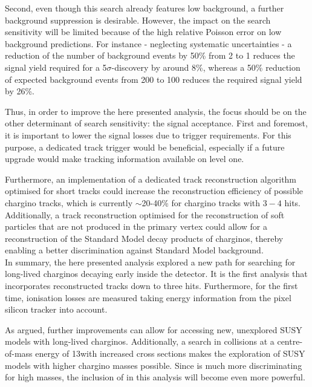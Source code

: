 Second, even though this search already features low background, a further background suppression is desirable.
However, the impact on the search sensitivity will be limited because of the high relative Poisson error on low background predictions.
For instance - neglecting systematic uncertainties - a reduction of the number of background events by 50\% from 2 to 1 reduces the signal yield required for a 5$\sigma$-discovery by around 8\%, whereas a 50\% reduction of expected background events from 200 to 100 reduces the required signal yield by 26\%.

Thus, in order to improve the here presented analysis, the focus should be on the other determinant of search sensitivity: the signal acceptance.
First and foremost, it is important to lower the signal losses due to trigger requirements.
For this purpose, a dedicated track trigger would be beneficial, especially if a future upgrade would make tracking information available on level one.%

Furthermore, an implementation of a dedicated track reconstruction algorithm optimised for short tracks could increase the reconstruction efficiency of possible chargino tracks, which is currently $\sim$20-40\% for chargino tracks with $3-4$ hits.
Additionally, a track reconstruction optimised for the reconstruction of soft particles that are not produced in the primary vertex could allow for a reconstruction of the Standard Model decay products of charginos, thereby enabling a better discrimination against Standard Model background.\\


In summary, the here presented analysis explored a new path for searching for long-lived charginos decaying early inside the detector.
It is the first analysis that incorporates reconstructed tracks down to three hits.
Furthermore, for the first time, ionisation losses are measured taking energy information from the pixel silicon tracker into account.

As argued, further improvements can allow for accessing new, unexplored SUSY models with long-lived charginos.
Additionally, a search in collisions at a centre-of-mass energy of 13\tev with increased cross sections makes the exploration of SUSY models with higher chargino masses possible.
Since \dedx is much more discriminating for high masses, the inclusion of \dedx in this analysis will become even more powerful. 

